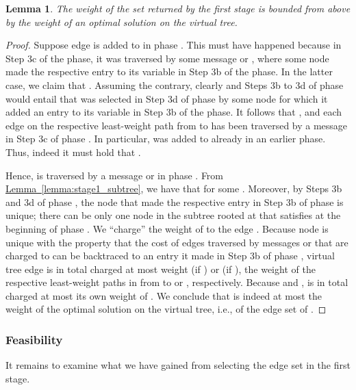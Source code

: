 \documentclass[letterpaper,11pt]{article}
\newtheorem{lemma}[theorem]{Lemma}
\newcommand{\namedref}[2]{\hyperref[#2]{#1~\ref*{#2}}}
\newcommand{\lemmaref}[1]{\namedref{Lemma}{#1}}
\begin{document}
\begin{lemma}\label{lemma:stage1_approx}
The weight of the set  returned by the first stage is bounded from above
by the weight of an optimal solution on the virtual tree.
\end{lemma}
\begin{proof}
Suppose edge  is added to  in phase .
This must have happened because in Step 3c of the phase, it was traversed by
some message  or , where some node 
made the respective entry to its  variable in Step 3b of the phase. In
the latter case, we claim that . Assuming the contrary, clearly 
and Steps 3b to 3d of phase  would entail that  was selected in Step 3d
of phase  by some node  for which it added an entry  to its
 variable in Step 3b of the phase. It follows that ,
and each edge on the respective least-weight path from  to 
has been traversed by a message in Step 3c of phase . In particular, 
was added to  already in an earlier phase. Thus, indeed it must hold that
.

Hence,  is traversed by a message  or 
in phase . From \lemmaref{lemma:stage1_subtree}, we have that
 for some . Moreover, by Steps
3b and 3d of phase , the node  that made the respective entry in Step 3b
of phase  is unique; there can be only one node  in the subtree rooted at
 that satisfies  at the beginning of phase . We
``charge'' the weight of  to the edge . Because node  is unique with the property that the
cost of edges traversed by messages  or  that
are charged to  can be backtraced to an entry it made in Step
3b of phase , virtual tree edge  is in total charged at most
weight  (if ) or  (if ), the
weight of the respective least-weight paths in  from  to  or
, respectively. Because  and ,  is in total
charged at most its own weight of . We conclude that  is indeed at most the weight of the optimal solution on the virtual
tree, i.e., of the edge set of .
\end{proof}

\subsubsection*{Feasibility}

It remains to examine what we have gained from selecting the edge set  in
the first stage.
\end{document}
